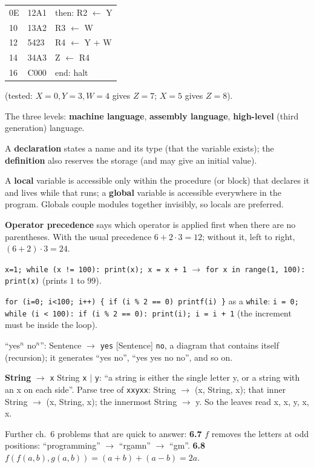 \documentclass{fkt-notes}
\begin{document}
\begin{description}[leftmargin=0pt,labelindent=0pt,itemsep=2pt]
\begin{center}
\begin{tabular}{@{}lll@{}}
            0E & 12A1 & then: R2 $\leftarrow$ Y \\ 10 & 13A2 & R3 $\leftarrow$ W \\ 12 & 5423 & R4 $\leftarrow$ Y + W \\ 14 & 34A3 & Z $\leftarrow$ R4 \\ 16 & C000 & end: halt
          \end{tabular}
        \end{center}
        (tested: $X=0,Y=3,W=4$ gives $Z=7$; $X=5$ gives $Z=8$).
  \item[6.6] The three levels: \textbf{machine language}, \textbf{assembly language}, \textbf{high-level} (third generation) language.
  \item[6.13] A \textbf{declaration} states a name and its type (that the variable exists); the \textbf{definition} also reserves the storage (and may give an initial value).
  \item[6.14] A \textbf{local} variable is accessible only within the procedure (or block) that declares it and lives while that runs; a \textbf{global} variable is accessible everywhere
        in the program. Globals couple modules together invisibly, so locals are preferred.
  \item[6.15] \textbf{Operator precedence} says which operator is applied first when there are no parentheses. With the usual precedence $6+2\cdot3=12$; without it, left to right,
        $(6+2)\cdot3=24$.
  \item[6.19] \texttt{x=1; while (x != 100): print(x); x = x + 1} $\to$ \texttt{for x in range(1, 100): print(x)} (prints $1$ to $99$).
  \item[6.21] \texttt{for (i=0; i<100; i++) \{ if (i \% 2 == 0) printf(i) \}} as a \texttt{while}: \texttt{i = 0; while (i < 100): if (i \% 2 == 0): print(i); i = i + 1} (the increment must be inside the loop).
  \item[6.40] ``yes$^n$ no$^n$'': Sentence $\to$ \texttt{yes} [Sentence] \texttt{no}, a diagram that contains itself (recursion); it generates ``yes no'', ``yes yes no no'', and so on.
  \item[6.42] \textbf{String} $\to$ \texttt{x} String \texttt{x} $\mid$ \texttt{y}: ``a string is either the single letter y, or a string with an x on each side''. Parse tree of \texttt{xxyxx}:
        String $\to$ (x, String, x); that inner String $\to$ (x, String, x); the innermost String $\to$ y. So the leaves read x, x, y, x, x.
\end{description}
Further ch.~6 problems that are quick to answer: \textbf{6.7} $f$ removes the letters at odd positions: ``programming'' $\to$ ``rgamn'' $\to$ ``gm''. \textbf{6.8} $f(f(a,b),g(a,b))=(a+b)+(a-b)=2a$.
\end{document}
